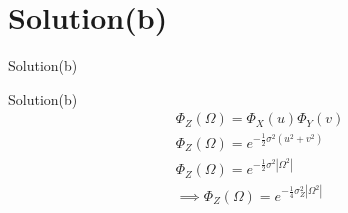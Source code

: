 \documentclass{beamer}
\providecommand{\abs}[1]{\left\vert#1\right\vert}
\begin{document}
\section{Solution(b)}
\begin{frame}{Solution(b)}
    \begin{block}{Solution(b)}
    \begin{align}
        \Phi_Z(\Omega) =\Phi_X(u)\Phi_Y(v)\\
        \Phi_Z(\Omega)=e^{-\frac{1}{2}\sigma^2(u^2+v^2)}\\
        \Phi_Z(\Omega)=e^{-\frac{1}{2}\sigma^2\abs{\Omega^2}}\\
        \implies\boxed{\Phi_Z(\Omega)=e^{-\frac{1}{4}\sigma_Z^2\abs{\Omega^2}}}
    \end{align}
            
    \end{block}
\end{frame}
\end{document}
